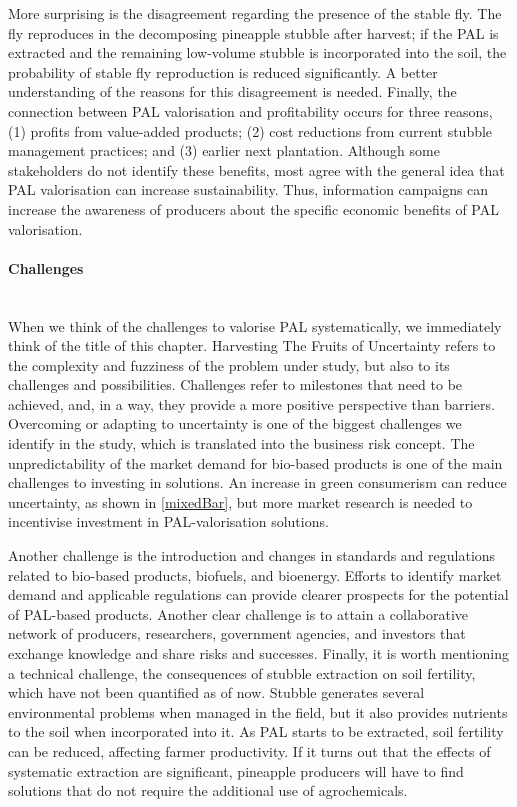 More surprising is the disagreement regarding the presence of the stable fly. The fly reproduces in the decomposing pineapple stubble after harvest; if the PAL is extracted and the remaining low-volume stubble is incorporated into the soil, the probability of stable fly reproduction is reduced significantly. A better understanding of the reasons for this disagreement is needed. Finally, the connection between PAL valorisation and profitability occurs for three reasons, (1) profits from value-added products; (2) cost reductions from current stubble management practices; and (3) earlier next plantation. Although some stakeholders do not identify these benefits, most agree with the general idea that PAL valorisation can increase sustainability. Thus, information campaigns can increase the awareness of producers about the specific economic benefits of PAL valorisation.

\paragraph{Challenges}\mbox{}\\
When we think of the challenges to valorise PAL systematically, we immediately think of the title of this chapter. Harvesting The Fruits of Uncertainty refers to the complexity and fuzziness of the problem under study, but also to its challenges and possibilities. Challenges refer to milestones that need to be achieved, and, in a way, they provide a more positive perspective than barriers. Overcoming or adapting to uncertainty is one of the biggest challenges we identify in the study, which is translated into the business risk concept. The unpredictability of the market demand for bio-based products is one of the main challenges to investing in solutions. An increase in green consumerism can reduce uncertainty, as shown in \cref{mixedBar}, but more market research is needed to incentivise investment in PAL-valorisation solutions. 

Another challenge is the introduction and changes in standards and regulations related to bio-based products, biofuels, and bioenergy. Efforts to identify market demand and applicable regulations can provide clearer prospects for the potential of PAL-based products. Another clear challenge is to attain a collaborative network of producers, researchers, government agencies, and investors that exchange knowledge and share risks and successes. Finally, it is worth mentioning a technical challenge, the consequences of stubble extraction on soil fertility, which have not been quantified as of now. Stubble generates several environmental problems when managed in the field, but it also provides nutrients to the soil when incorporated into it. As PAL starts to be extracted, soil fertility can be reduced, affecting farmer productivity. If it turns out that the effects of systematic extraction are significant, pineapple producers will have to find solutions that do not require the additional use of agrochemicals. 

